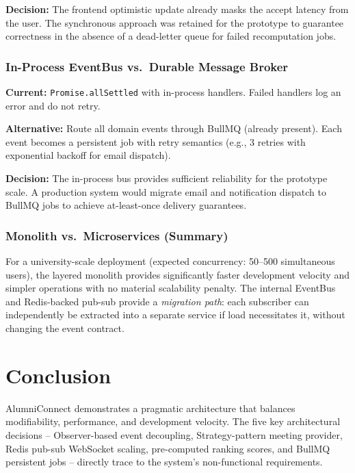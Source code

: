 \documentclass[12pt,a4paper]{article}
\begin{document}
\textbf{Decision:} The frontend optimistic update already masks the accept latency from the user. The synchronous approach was retained for the prototype to guarantee correctness in the absence of a dead-letter queue for failed recomputation jobs.

\subsubsection{In-Process EventBus vs.\ Durable Message Broker}

\textbf{Current:} \texttt{Promise.allSettled} with in-process handlers. Failed handlers log an error and do not retry.

\textbf{Alternative:} Route all domain events through BullMQ (already present). Each event becomes a persistent job with retry semantics (e.g., 3 retries with exponential backoff for email dispatch).

\textbf{Decision:} The in-process bus provides sufficient reliability for the prototype scale. A production system would migrate email and notification dispatch to BullMQ jobs to achieve at-least-once delivery guarantees.

\subsubsection{Monolith vs.\ Microservices (Summary)}

For a university-scale deployment (expected concurrency: 50--500 simultaneous users), the layered monolith provides significantly faster development velocity and simpler operations with no material scalability penalty. The internal EventBus and Redis-backed pub-sub provide a \textit{migration path}: each subscriber can independently be extracted into a separate service if load necessitates it, without changing the event contract.

\newpage

\section*{Conclusion}
{}

AlumniConnect demonstrates a pragmatic architecture that balances modifiability, performance, and development velocity. The five key architectural decisions -- Observer-based event decoupling, Strategy-pattern meeting provider, Redis pub-sub WebSocket scaling, pre-computed ranking scores, and BullMQ persistent jobs -- directly trace to the system's non-functional requirements.
\end{document}
